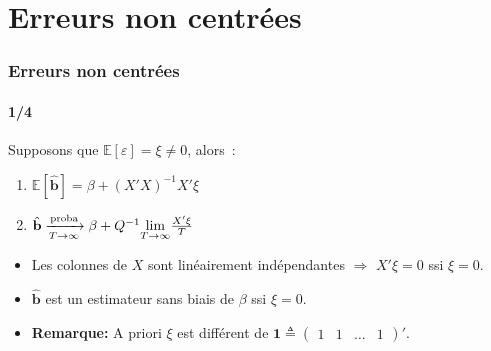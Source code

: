 \documentclass[10pt]{beamer}
\begin{document}
\section{Erreurs non centrées}

\begin{frame}
  \frametitle{Erreurs non centrées}
  \framesubtitle{1/4}

  \begin{prop}\label{prop:bhat:non-zero-mean-error}
    Supposons que $\mathbb E\left[\varepsilon\right] = \xi \neq 0$, alors~:
    \begin{enumerate}

    \item $\mathbb E\left[ \hat{\mathbf b} \right] = \beta + (X'X)^{-1}X'\xi$
    \item $\hat{\mathbf b} \xrightarrow[T\rightarrow\infty]{\text{proba}} \beta + Q^{-1}\underset{T\rightarrow\infty}{\lim} \frac{X'\xi}{T}$

    \end{enumerate}
  \end{prop}

  \bigskip

  \begin{itemize}

  \item Les colonnes de $X$ sont linéairement indépendantes $\Rightarrow$ $X'\xi=0$ ssi $\xi=0$.\newline

  \item $\hat{\mathbf b}$ est un estimateur sans biais de $\beta$ ssi $\xi=0$.\newline

  \item \textbf{Remarque:} A priori $\xi$ est différent de $\mathbf 1 \triangleq \begin{pmatrix}1 & 1 & \dots & 1\end{pmatrix}'$.

  \end{itemize}

\end{frame}
\end{document}
